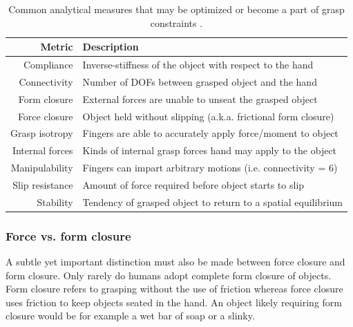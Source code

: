 \begin{table}[h]
\begin{tabular}{rl}
\textbf{Metric}                       & \textbf{Description}                                                               \\ \hline
\multicolumn{1}{|r|}{Compliance}      & \multicolumn{1}{l|}{Inverse-stiffness of the object with respect to the hand}      \\ \hline
\multicolumn{1}{|r|}{Connectivity}    & \multicolumn{1}{l|}{Number of DOFs between grasped object and the hand}            \\ \hline
\multicolumn{1}{|r|}{Form closure}    & \multicolumn{1}{l|}{External forces are unable to unseat the grasped object}       \\ \hline
\multicolumn{1}{|r|}{Force closure}   & \multicolumn{1}{l|}{Object held without slipping (a.k.a. frictional form closure)} \\ \hline
\multicolumn{1}{|r|}{Grasp isotropy}  & \multicolumn{1}{l|}{Fingers are able to accurately apply force/moment to object}   \\ \hline
\multicolumn{1}{|r|}{Internal forces} & \multicolumn{1}{l|}{Kinds of internal grasp forces hand may apply to the object}   \\ \hline
\multicolumn{1}{|r|}{Manipulability}  & \multicolumn{1}{l|}{Fingers can impart arbitrary motions (i.e. connectivity = 6)}  \\ \hline
\multicolumn{1}{|r|}{Slip resistance} & \multicolumn{1}{l|}{Amount of force required before object starts to slip}         \\ \hline
\multicolumn{1}{|r|}{Stability}       & \multicolumn{1}{l|}{Tendency of grasped object to return to a spatial equilibrium} \\ \hline
\end{tabular}
\caption{Common analytical measures that may be optimized or become a part of grasp constraints \cite{cutkosky1990human}.}
\label{tbl:grasp_metrics}
\end{table}

\subsubsection*{Force vs. form closure}
A subtle yet important distinction must also be made between force closure and form closure.
Only rarely do humans adopt complete form closure of objects.
Form closure refers to grasping without the use of friction whereas force closure uses friction to keep objects seated in the hand.
An object likely requiring form closure would be for example a wet bar of soap or a slinky.

